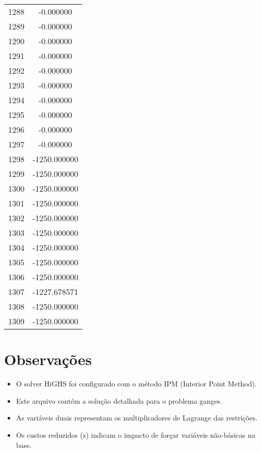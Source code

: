\documentclass[12pt]{article}
\begin{document}
\begin{longtable}{@{}cc@{}}
1288 & -0.000000 \\
1289 & -0.000000 \\
1290 & -0.000000 \\
1291 & -0.000000 \\
1292 & -0.000000 \\
1293 & -0.000000 \\
1294 & -0.000000 \\
1295 & -0.000000 \\
1296 & -0.000000 \\
1297 & -0.000000 \\
1298 & -1250.000000 \\
1299 & -1250.000000 \\
1300 & -1250.000000 \\
1301 & -1250.000000 \\
1302 & -1250.000000 \\
1303 & -1250.000000 \\
1304 & -1250.000000 \\
1305 & -1250.000000 \\
1306 & -1250.000000 \\
1307 & -1227.678571 \\
1308 & -1250.000000 \\
1309 & -1250.000000 \\

\end{longtable}


\section{Observações}

\begin{itemize}
\item O solver HiGHS foi configurado com o método IPM (Interior Point Method).
\item Este arquivo contém a solução detalhada para o problema ganges.
\item As variáveis duais representam os multiplicadores de Lagrange das restrições.
\item Os custos reduzidos (z) indicam o impacto de forçar variáveis não-básicas na base.
\end{itemize}
\end{document}
